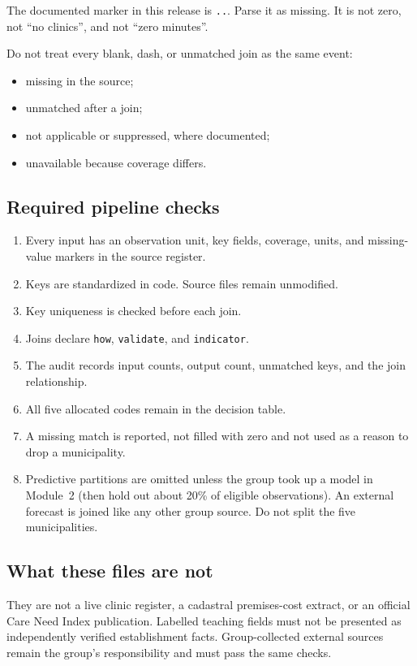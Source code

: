\documentclass[11pt,a4paper]{article}
\begin{document}
The documented marker in this release is \texttt{..}.
Parse it as missing. It is not zero, not ``no clinics'', and not
``zero minutes''.

Do not treat every blank, dash, or unmatched join as the same event:
\begin{itemize}
    \item missing in the source;
    \item unmatched after a join;
    \item not applicable or suppressed, where documented;
    \item unavailable because coverage differs.
\end{itemize}

\subsection*{Required pipeline checks}

\begin{enumerate}
    \item Every input has an observation unit, key fields, coverage,
    units, and missing-value markers in the source register.
    \item Keys are standardized in code. Source files remain unmodified.
    \item Key uniqueness is checked before each join.
    \item Joins declare \texttt{how}, \texttt{validate}, and
    \texttt{indicator}.
    \item The audit records input counts, output count, unmatched keys,
    and the join relationship.
    \item All five allocated codes remain in the decision table.
    \item A missing match is reported, not filled with zero and not
    used as a reason to drop a municipality.
    \item Predictive partitions are omitted unless the group took
    up a model in Module~2 (then hold out about 20\% of eligible
    observations). An external forecast is joined like any other
    group source. Do not split the five municipalities.
\end{enumerate}

\subsection*{What these files are not}

They are not a live clinic register, a cadastral premises-cost extract,
or an official Care Need Index publication. Labelled teaching fields
must not be presented as independently verified establishment facts.
Group-collected external sources remain the group's responsibility
and must pass the same checks.
\end{document}
